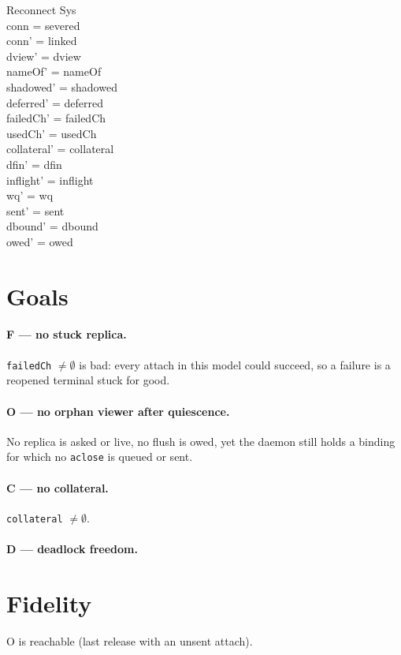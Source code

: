 \documentclass[a4paper,10pt,fleqn]{article}
\begin{document}
\begin{schema}{Reconnect}
  \Delta Sys \\
\where
  conn = severed \\
  conn' = linked \\
  dview' = dview \\
  nameOf' = nameOf \\
  shadowed' = shadowed \\
  deferred' = deferred \\
  failedCh' = failedCh \\
  usedCh' = usedCh \\
  collateral' = collateral \\
  dfin' = dfin \\
  inflight' = inflight \\
  wq' = wq \\
  sent' = sent \\
  dbound' = dbound \\
  owed' = owed
\end{schema}


\section{Goals}

\paragraph{F --- no stuck replica.}  \texttt{failedCh} $\neq \emptyset$ is bad:
every attach in this model could succeed, so a failure is a reopened
terminal stuck for good.

\paragraph{O --- no orphan viewer after quiescence.}  No replica is asked or
live, no flush is owed, yet the daemon still holds a binding for which no
\texttt{aclose} is queued or sent.

\paragraph{C --- no collateral.}  \texttt{collateral} $\neq \emptyset$.

\paragraph{D --- deadlock freedom.}

\section{Fidelity}

O is reachable (last release with an unsent attach).
\end{document}

